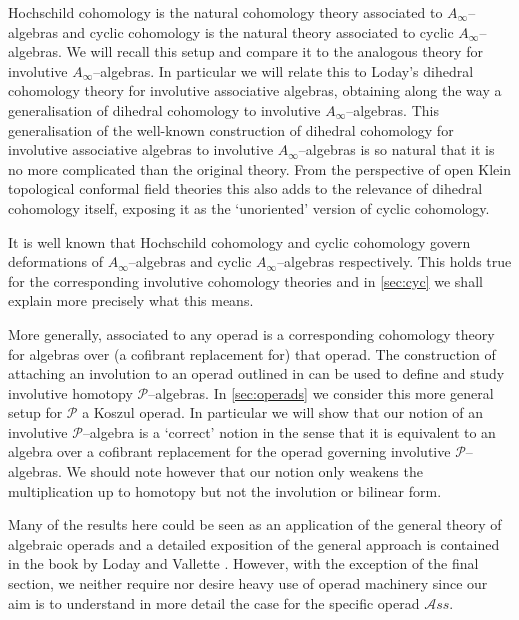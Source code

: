 \documentclass[british]{amsart}
\theoremstyle{plain}
\theoremstyle{definition}
{
\newaliascnt{{definition}}{theorem}\newtheorem{{definition}}[{definition}]{{Definition}}\aliascntresetthe{{definition}}\expandafterautorefname\endcsname{{Definition}}}
{
\newaliascnt{{remark}}{theorem}\newtheorem{{remark}}[{remark}]{{Remark}}\aliascntresetthe{{remark}}\expandafterautorefname\endcsname{{Remark}}}
{
\newaliascnt{{example}}{theorem}\newtheorem{{example}}[{example}]{{Example}}\aliascntresetthe{{example}}\expandafterautorefname\endcsname{{Example}}}
{
\newaliascnt{{examples}}{theorem}\newtheorem{{examples}}[{examples}]{{Examples}}\aliascntresetthe{{examples}}\expandafterautorefname\endcsname{{Examples}}}
{
\newaliascnt{{notation}}{theorem}\newtheorem{{notation}}[{notation}]{{Notation}}\aliascntresetthe{{notation}}\expandafterautorefname\endcsname{{Notation}}}
{
\newaliascnt{{convention}}{theorem}\newtheorem{{convention}}[{convention}]{{Convention}}\aliascntresetthe{{convention}}\expandafterautorefname\endcsname{{Convention}}}
\numberwithin{equation}{section}
\numberwithin{figure}{section}
\begin{document}
Hochschild cohomology is the natural cohomology theory associated to $A_\infty$--algebras and cyclic cohomology is the natural theory associated to cyclic $A_\infty$--algebras. We will recall this setup and compare it to the analogous theory for involutive $A_\infty$--algebras. In particular we will relate this to Loday's dihedral cohomology theory \cite{loday1987:dihedral,loday1992:cyclichombook} for involutive associative algebras, obtaining along the way a generalisation of dihedral cohomology to involutive $A_\infty$--algebras. This generalisation of the well-known construction of dihedral cohomology for involutive associative algebras to involutive $A_\infty$--algebras is so natural that it is no more complicated than the original theory. From the perspective of open Klein topological conformal field theories this also adds to the relevance of dihedral cohomology itself, exposing it as the `unoriented' version of cyclic cohomology.

It is well known that Hochschild cohomology and cyclic cohomology govern deformations of $A_\infty$--algebras and cyclic $A_\infty$--algebras respectively. This holds true for the corresponding involutive cohomology theories and in \autoref{sec:cyc} we shall explain more precisely what this means.

More generally, associated to any operad is a corresponding cohomology theory for algebras over (a cofibrant replacement for) that operad. The construction of attaching an involution to an operad outlined in \cite{braun:moduliklein} can be used to define and study involutive homotopy $\mathcal{P}$--algebras. In \autoref{sec:operads} we consider this more general setup for $\mathcal{P}$ a Koszul operad. In particular we will show that our notion of an involutive $\mathcal{P}$--algebra is a `correct' notion in the sense that it is equivalent to an algebra over a cofibrant replacement for the operad governing involutive $\mathcal{P}$--algebras. We should note however that our notion only weakens the multiplication up to homotopy but not the involution or bilinear form.

Many of the results here could be seen as an application of the general theory of algebraic operads and a detailed exposition of the general approach is contained in the book by Loday and Vallette \cite{lodayvallette2012:operadbook}. However, with the exception of the final section, we neither require nor desire heavy use of operad machinery since our aim is to understand in more detail the case for the specific operad ${\mathcal{A}ss}$.
\end{document}
